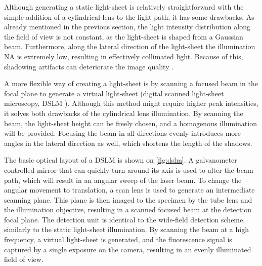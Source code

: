     Although generating a static light-sheet is relatively straightforward with the simple addition of a cylindrical lens to the light path, it has some drawbacks. As already mentioned in the previous section, the light intensity distribution along the field of view is not constant, as the light-sheet is shaped from a Gaussian beam. Furthermore, along the lateral direction of the light-sheet the illumination NA is extremely low, resulting in effectively collimated light. Because of this, shadowing artifacts can deteriorate the image quality \cite{huisken_even_2007}.

    A more flexible way of creating a light-sheet is by scanning a focused beam in the focal plane to generate a virtual light-sheet (digital scanned light-sheet microscopy, DSLM \cite{keller_reconstruction_2008}). Although this method might require higher peak intensities, it solves both drawbacks of the cylindrical lens illumination. By scanning the beam, the light-sheet height can be freely chosen, and a homogenous illumination will be provided. Focusing the beam in all directions evenly introduces more angles in the lateral direction as well, which shortens the length of the shadows.
    
    The basic optical layout of a DSLM is shown on \autoref{fig:dslm}. A galvanometer controlled mirror that can quickly turn around its axis is used to alter the beam path, which will result in an angular sweep of the laser beam. To change the angular movement to translation, a scan lens is used to generate an intermediate scanning plane. This plane is then imaged to the specimen by the tube lens and the illumination objective, resulting in a scanned focused beam at the detection focal plane. The detection unit is identical to the wide-field detection scheme, similarly to the static light-sheet illumination. By scanning the beam at a high frequency, a virtual light-sheet is generated, and the fluorescence signal is captured by a single exposure on the camera, resulting in an evenly illuminated field of view.

  



  



